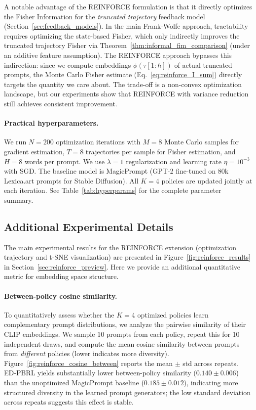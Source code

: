 \documentclass{article}
\begin{document}
A notable advantage of the REINFORCE formulation is that it directly optimizes the Fisher Information for the \emph{truncated trajectory} feedback model (Section~\ref{sec:feedback_models}). In the main Frank-Wolfe approach, tractability requires optimizing the state-based Fisher, which only indirectly improves the truncated trajectory Fisher via Theorem~\ref{thm:informal_fim_comparison} (under an additive feature assumption). The REINFORCE approach bypasses this indirection: since we compute embeddings $\phi(\tau[1:h])$ of actual truncated prompts, the Monte Carlo Fisher estimate (Eq.~\ref{eq:reinforce_I_sum}) directly targets the quantity we care about. The trade-off is a non-convex optimization landscape, but our experiments show that REINFORCE with variance reduction still achieves consistent improvement.

\paragraph{Practical hyperparameters.} We run $N=200$ optimization iterations with $M=8$ Monte Carlo samples for gradient estimation, $T=8$ trajectories per sample for Fisher estimation, and $H=8$ words per prompt. We use $\lambda=1$ regularization and learning rate $\eta = 10^{-3}$ with SGD. The baseline model is MagicPrompt (GPT-2 fine-tuned on 80k Lexica.art prompts for Stable Diffusion). All $K=4$ policies are updated jointly at each iteration. See Table~\ref{tab:hyperparams} for the complete parameter summary.

\subsection{Additional Experimental Details}
\label{sec:reinforce:experiments}

The main experimental results for the REINFORCE extension (optimization trajectory and t-SNE visualization) are presented in Figure~\ref{fig:reinforce_results} in Section~\ref{sec:reinforce_preview}. Here we provide an additional quantitative metric for embedding space structure.

\paragraph{Between-policy cosine similarity.}
To quantitatively assess whether the $K=4$ optimized policies learn complementary prompt distributions, we analyze the pairwise similarity of their CLIP embeddings. We sample 10 prompts from each policy, repeat this for 10 independent draws, and compute the mean cosine similarity between prompts from \emph{different} policies (lower indicates more diversity). Figure~\ref{fig:reinforce_cosine_between} reports the mean $\pm$ std across repeats. ED-PBRL yields substantially lower between-policy similarity ($0.140 \pm 0.006$) than the unoptimized MagicPrompt baseline ($0.185 \pm 0.012$), indicating more structured diversity in the learned prompt generators; the low standard deviation across repeats suggests this effect is stable.
\end{document}
